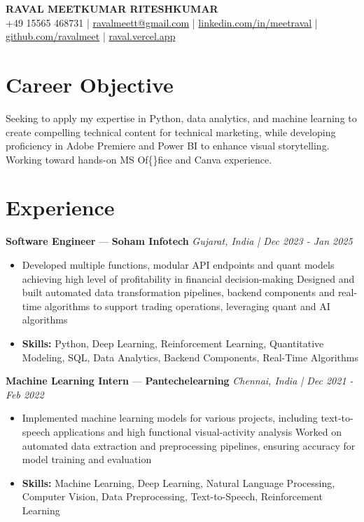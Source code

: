 \documentclass[a4paper,10pt]{article}
\begin{document}
\begin{center}
  {\Large\bfseries RAVAL MEETKUMAR RITESHKUMAR}\\[2pt]
  {\small +49 15565 468731 \;|\; \href{mailto:ravalmeett@gmail.com}{ravalmeett@gmail.com} \;|\; \href{https://www.linkedin.com/in/meetraval/}{linkedin.com/in/meetraval} \;|\; \href{https://github.com/ravalmeet}{github.com/ravalmeet} \;|\; \href{https://raval.vercel.app/}{raval.vercel.app}}
\end{center}
\vspace{-3pt}

\section*{Career Objective}
Seeking to apply my expertise in Python, data analytics, and machine learning to create compelling technical content for technical marketing, while developing proficiency in Adobe Premiere and Power BI to enhance visual storytelling. Working toward hands-on MS Of\{\}fice and Canva experience.\par

\section*{Experience}
\textbf{Software Engineer} — \textbf{Soham Infotech} \hfill \textit{Gujarat, India \;|\; Dec 2023 - Jan 2025}\par
\vspace{1pt}
\begin{itemize}
  \item Developed multiple functions, modular API endpoints and quant models achieving high level of profitability in financial decision-making Designed and built automated data transformation pipelines, backend components and real-time algorithms to support trading operations, leveraging quant and AI algorithms
  \item \textbf{Skills:} Python, Deep Learning, Reinforcement Learning, Quantitative Modeling, SQL, Data Analytics, Backend Components, Real-Time Algorithms
\end{itemize}
\vspace{3pt}
\textbf{Machine Learning Intern} — \textbf{Pantechelearning} \hfill \textit{Chennai, India \;|\; Dec 2021 - Feb 2022}\par
\vspace{1pt}
\begin{itemize}
  \item Implemented machine learning models for various projects, including text-to-speech applications and high functional visual-activity analysis Worked on automated data extraction and preprocessing pipelines, ensuring accuracy for model training and evaluation
  \item \textbf{Skills:} Machine Learning, Deep Learning, Natural Language Processing, Computer Vision, Data Preprocessing, Text-to-Speech, Reinforcement Learning
\end{itemize}
\end{document}
